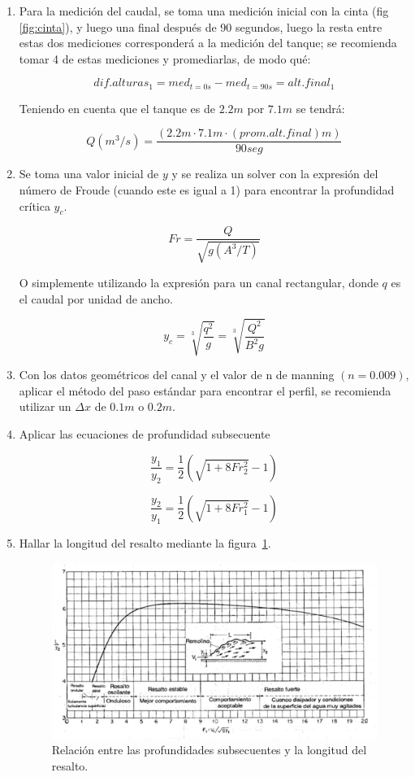 \documentclass[10pt, a4paper]{exam}
\begin{document}
\begin{enumerate}

    \item Para la medición del caudal, se toma una medición inicial con la cinta (fig \ref{fig:cinta}), y luego una final después de 90 segundos, luego la resta entre estas dos mediciones corresponderá a la medición del tanque; se recomienda tomar 4 de estas mediciones y promediarlas, de modo qué:

    $$dif.alturas_1=med_{t=0s}-med_{t=90s}=alt.final_{1}$$

    Teniendo en cuenta que el tanque es de $2.2m$ por $7.1m$ se tendrá:

    $$Q (m^3/s)=\dfrac{(2.2m\cdot 7.1m \cdot (prom.alt.final) m)}{90seg}$$
    
    \item Se toma una valor inicial de $y$ y se realiza un solver con la expresión del número de Froude (cuando este es igual a 1) para encontrar la profundidad crítica $y_c$.

    $$Fr=\dfrac{Q}{\sqrt{g(A^3/T)}}$$

    O simplemente utilizando la expresión para un canal rectangular, donde $q$ es el caudal por unidad de ancho.

    $$y_c=\sqrt[3]{\dfrac{q^2}{g}}=\sqrt[3]{\dfrac{Q^2}{B^2 g}}$$
    
    \item Con los datos geométricos del canal y el valor de n de manning $(n=0.009)$, aplicar el método del paso estándar para encontrar el perfil, se recomienda utilizar un $\Delta x$ de $0.1m$ o $0.2m$.


    
    \item Aplicar las ecuaciones de profundidad subsecuente

    $$\dfrac{y_1}{y_2}=\dfrac{1}{2}\left(\sqrt{1+8Fr^2_2}-1\right)$$    


    $$\dfrac{y_2}{y_1}=\dfrac{1}{2}\left(\sqrt{1+8Fr^2_1}-1\right)$$
    
\item Hallar la longitud del resalto mediante la figura~\ref{resh}.

    \begin{figure}[h]
        \centering
        \includegraphics[width=0.9\linewidth]{Images/resalto.png}
        \caption{Relación entre las profundidades subsecuentes y la longitud del resalto.}
        \label{resh}
    \end{figure}


\end{enumerate}
\end{document}
